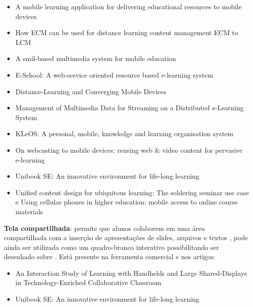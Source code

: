 \vspace{-5mm}
\begin{itemize}
    \item A mobile learning application for delivering educational resources to mobile devices \cite{boyinbode_mobile_2012}
    \item How ECM can be used for distance learning content management ECM to LCM \cite{daoudi_how_2012}
    \item A smil-based multimedia system for mobile education \cite{di_smil-based_2009}
    \item E-School: A web-service oriented resource based e-learning system \cite{sultana_e-school:_2010}
    \item Distance-Learning and Converging Mobile Devices \cite{hoganson_distance-learning_2009}
    \item Management of Multimedia Data for Streaming on a Distributed e-Learning System \cite{hayakawa_management_2012}
    \item KLeOS: A personal, mobile, knowledge and learning organisation system \cite{vavoula_kleos:_2002}
    \item On webcasting to mobile devices: reusing web \& video content for pervasive e-learning \cite{turro_webcasting_2007}
    \item Unibook SE: An innovative environment for life-long learning \cite{chimos_unibook_2012}
    \item Unified content design for ubiquitous learning: The soldering seminar use case \cite{rodriguez-alsina_unified_2010} e Using cellular phones in higher education: mobile access to online course materials \cite{mermelstein_using_2005}
\end{itemize}

\textbf{Tela compartilhada}: permite que alunos colaborem em uma área compartilhada com a inserção de apresentações de slides, arquivos e textos \cite{liu_interaction_2007}, pode ainda ser utilizada como um quadro-branco interativo possibilitando ser desenhado sobre \cite{chimos_unibook_2012, griffioen_teaching_1998}. Está presente na ferramenta comercial  e nos artigos: 

\vspace{-5mm}
\begin{itemize}
    \item An Interaction Study of Learning with Handhelds and Large Shared-Displays in Technology-Enriched Collaborative Classroom \cite{liu_interaction_2007}
    \item Unibook SE: An innovative environment for life-long learning \cite{chimos_unibook_2012}
\end{itemize}

